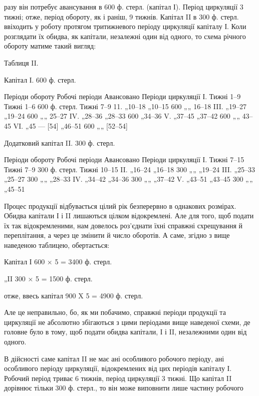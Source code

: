 \parcont{}  %
разу він потребує авансування в 600 ф. стерл. (капітал І). Період циркуляції
3 тижні; отже, період обороту, як і раніш, 9 тижнів. Капітал II
в 300 ф. стерл. ввіходить у роботу протягом тритижневого періоду циркуляції
капіталу І. Коли розглядати їх обидва, як капітали, незалежні
один від одного, то схема річного обороту матиме такий вигляд:

Таблиця II.

Капітал І. 600 ф. стерл.

Періоди обороту    Робочі періоди    Авансовано    Періоди циркуляції
І. Тижні 1--9    Тижні 1--6    600 ф. стерл. Тижні 7--9
11. „10--18 „10--15    600 „„ 16--18
III. „19--27 „19--24    600 „„ 25--27
IV. „28--36 „28--33    600 „34--36
V. „37--45 „37--42    600 „„ 43--45
VI. „45 — [54] „46--51    600 „„ [52--54]

Додатковий капітал II. 300 ф. стерл.

Періоди обороту    Робочі періоди    Авансовано    Періоди циркуляції
І. Тижні 7--15    Тижні 7--9    300 ф. стерл. Тижні 10--15
II. „16--24 „16--18    300 „„ „19--24
III. „25--33 „25--27    300 „„ „28--33
IV. „34--42 „34--36    300 „„ „37--42
V. „43--51 „43--45    300 „„ „45--51

Процес продукції відбувається цілий рік безперервно в однакових
розмірах. Обидва капітали І і II лишаються цілком відокремлені. Але
для того, щоб подати їх так відокремленими, нам довелось роз’єднати
їхні справжні схрещування й переплітання, а через це змінити й число
оборотів. А саме, згідно з вище наведеною таблицею, обертається:

Капітал І 600 × 5 = 3400 ф. стерл.

„II 300 × 5 = 1500 ф. стерл.

отже, ввесь капітал    900 X 5 = 4900 ф. стерл.

Але це неправильно, бо, як ми побачимо, справжні періоди продукції
та циркуляції не абсолютно збігаються з цими періодами вище наведеної
схеми, де головне було в тому, щоб подати обидва капітали, І і II, незалежними
один від одного.

В дійсності саме капітал II не має ані особливого робочого періоду, ані особливого
періоду циркуляції, відокремлених від цих періодів капіталу І. Робочий
період триває 6 тижнів, період циркуляції 3 тижні. Що капітал II дорівнює
тільки 300 ф. стерл., то він може виповнити лише частину робочого
\parbreak{}  %
